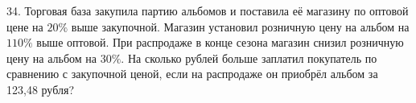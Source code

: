 34. Торговая база закупила партию альбомов и поставила её магазину по оптовой цене на $20\%$ выше закупочной. Магазин установил розничную цену на альбом на $110\%$ выше оптовой. При распродаже в конце сезона магазин снизил розничную цену на альбом на $30\%.$ На сколько рублей больше заплатил покупатель по сравнению с закупочной ценой, если на распродаже он приобрёл альбом за 123,48 рубля?\\
